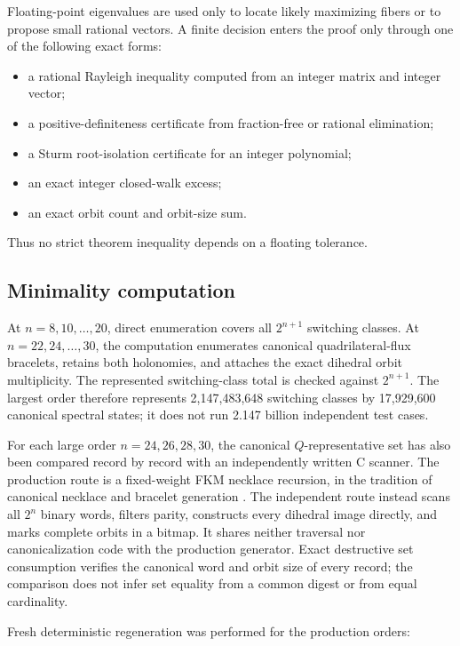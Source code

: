 Floating-point eigenvalues are used only to locate likely maximizing fibers or
to propose small rational vectors. A finite decision enters the proof only
through one of the following exact forms:

\begin{itemize}
\item a rational Rayleigh inequality computed from an integer matrix and integer vector;
\item a positive-definiteness certificate from fraction-free or rational elimination;
\item a Sturm root-isolation certificate for an integer polynomial;
\item an exact integer closed-walk excess;
\item an exact orbit count and orbit-size sum.
\end{itemize}

Thus no strict theorem inequality depends on a floating tolerance.

\subsection{Minimality computation}

At \(n=8,10,\ldots,20\), direct enumeration covers all \(2^{n+1}\) switching classes.
At \(n=22,24,\ldots,30\), the computation enumerates canonical quadrilateral-flux
bracelets, retains both holonomies, and attaches the exact dihedral orbit
multiplicity. The represented switching-class total is checked against
\(2^{n+1}\). The largest order therefore represents 2,147,483,648 switching
classes by 17,929,600 canonical spectral states; it does not run 2.147 billion
independent test cases.

For each large order \(n=24,26,28,30\), the canonical \(Q\)-representative set
has also been compared record by record with an independently written C
scanner. The production route is a fixed-weight FKM necklace recursion, in the
tradition of canonical necklace and bracelet generation
\cite{FredricksenMaiorana1978,Sawada2001}. The independent route instead scans
all \(2^n\) binary words, filters parity, constructs every dihedral image
directly, and marks complete orbits in a bitmap. It shares neither traversal
nor canonicalization code with the production generator. Exact destructive
set consumption verifies the canonical word and orbit size of every record;
the comparison does not infer set equality from a common digest or from equal
cardinality.

Fresh deterministic regeneration was performed for the production orders:

